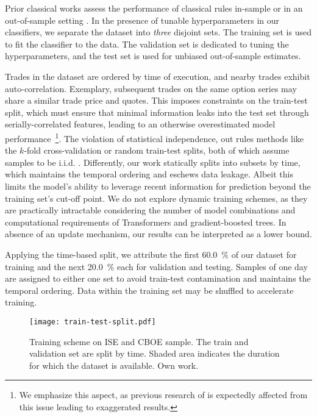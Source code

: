 Prior classical works assess the performance of classical rules in-sample \autocite[cp.][541]{ellisAccuracyTradeClassification2000} or in an out-of-sample setting \autocites[cp.][7--9]{grauerOptionTradeClassification2022}[][3814--3815]{chakrabartyTradeClassificationAlgorithms2007}.  In the presence of tunable hyperparameters in our classifiers, we separate the dataset into \emph{three} disjoint sets. The training set is used to fit the classifier to the data. The validation set is dedicated to tuning the hyperparameters, and the test set is used for unbiased out-of-sample estimates.

Trades in the dataset are ordered by time of execution, and nearby trades exhibit auto-correlation. Exemplary, subsequent trades on the same option series may share a similar trade price and quotes. This imposes constraints on the train-test split, which must ensure that minimal information leaks into the test set through serially-correlated features, leading to an otherwise overestimated model performance~\footnote{We emphasize this aspect, as previous research of \textcite[][14]{ronenMachineLearningTrade2022} is expectedly affected from this issue leading to exaggerated results.}. The violation of statistical independence, out rules methods like the $k$-fold cross-validation or random train-test splits, both of which assume samples to be i.i.d. \autocite[][103--105]{lopezdepradoAdvancesFinancialMachine2018}. Differently, our work statically splits into subsets by time, which maintains the temporal ordering and eschews data leakage. Albeit this limits the model's ability to leverage recent information for prediction beyond the training set's cut-off point. We do not explore dynamic training schemes, as they are practically intractable considering the number of model combinations and computational requirements of Transformers and gradient-boosted trees. In absence of an update mechanism, our results can be interpreted as a lower bound.

Applying the time-based split, we attribute the first \SI{60.0}{\percent} of our dataset for training and the next \SI{20.0}{\percent} each for validation and testing. Samples of one day are assigned to either one set to avoid train-test contamination and maintains the temporal ordering. Data within the training set may be shuffled to accelerate training.

\begin{figure}[ht]
    \centering
    \texttt{[image: train-test-split.pdf]}
    \caption[Training Schemes]{Training scheme on \gls{ISE} and \gls{CBOE} sample. The train and validation set are split by time. Shaded area  indicates the duration for which the dataset is available. Own work.}
    \label{fig:train-test-split}
\end{figure}

